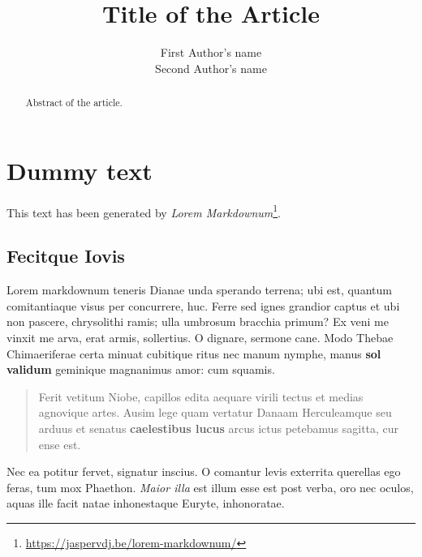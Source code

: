 \documentclass[fleqn,10pt]{article} %
\title{Title of the Article} %
\author{
First Author's name\\ Second Author's name
} %
\begin{document}

\maketitle %

\begin{abstract}
Abstract of the article.
\end{abstract}

\tableofcontents %

\thispagestyle{empty} %



\hypertarget{dummy-text}{%
\section{Dummy text}\label{dummy-text}}

This text has been generated by \emph{Lorem Markdownum}\footnote{\url{https://jaspervdj.be/lorem-markdownum/}}.

\hypertarget{fecitque-iovis}{%
\subsection{Fecitque Iovis}\label{fecitque-iovis}}

Lorem markdownum teneris Dianae unda sperando terrena; ubi est, quantum comitantiaque visus per concurrere, huc.
Ferre sed ignes grandior captus et ubi non pascere, chrysolithi ramis; ulla umbrosum bracchia primum?
Ex veni me vinxit me arva, erat armis, sollertius.
O dignare, sermone cane.
Modo Thebae Chimaeriferae certa minuat cubitique ritus nec manum nymphe, manus \textbf{sol validum} geminique magnanimus amor: cum squamis.

\begin{quote}
Ferit vetitum Niobe, capillos edita aequare virili tectus et medias agnovique artes.
Ausim lege quam vertatur Danaam Herculeamque seu arduus et senatus \textbf{caelestibus lucus} arcus ictus petebamus sagitta, cur ense est.
\end{quote}

Nec ea potitur fervet, signatur inscius.
O comantur levis exterrita querellas ego feras, tum mox Phaethon.
\emph{Maior illa} est illum esse est post verba, oro nec oculos, aquas ille facit natae inhonestaque Euryte, inhonoratae.
\end{document}

